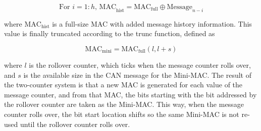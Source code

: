 \begin{equation}
\text{For }i=1:h\text{, MAC}_\text{hist} = \text{MAC}_{\text{full}}\oplus\text{Message}_{n-i}
\end{equation}

where $\text{MAC}_\text{hist}$ is a full-size MAC with added message history information. This value is finally truncated according to the trunc function, defined as

\begin{equation}
\text{MAC}_{\text{mini}} = \text{MAC}_{\text{full}}(l,l+s)
\end{equation}

where $l$ is the rollover counter, which ticks when the message counter rolls over, and $s$ is the available size in the CAN message for the Mini-MAC. The result of the two-counter system is that a new MAC is generated for each value of the message counter, and from that MAC, the bits starting with the bit addressed by the rollover counter are taken as the Mini-MAC. This way, when the message counter rolls over, the bit start location shifts so the same Mini-MAC is not re-used until the rollover counter rolls over.







